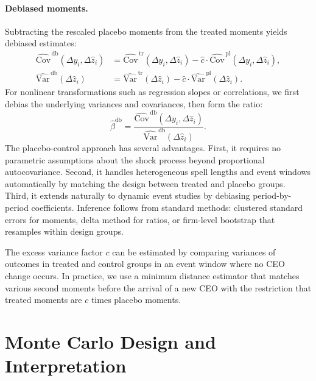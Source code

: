 \documentclass[11pt,a4paper]{article}
\newcommand{\Var}{\text{Var}}
\newcommand{\Cov}{\text{Cov}}
\begin{document}
\paragraph{Debiased moments.} Subtracting the rescaled placebo moments from the treated moments yields debiased estimates:
\begin{align}
\widehat{\Cov}^{\,\text{db}}(\Delta y_i,\Delta \hat z_i) &= \widehat{\Cov}^{\,\text{tr}}(\Delta y_i,\Delta \hat z_i) - \hat c\cdot\widehat{\Cov}^{\,\text{pl}}(\Delta y_i,\Delta \hat z_i),\\
\widehat{\Var}^{\,\text{db}}(\Delta \hat z_i) &= \widehat{\Var}^{\,\text{tr}}(\Delta \hat z_i) - \hat c\cdot\widehat{\Var}^{\,\text{pl}}(\Delta \hat z_i).
\end{align}
For nonlinear transformations such as regression slopes or correlations, we first debias the underlying variances and covariances, then form the ratio:
\begin{equation}
\hat\beta^{\text{db}} = \frac{\widehat{\Cov}^{\,\text{db}}(\Delta y_i,\Delta \hat z_i)}{\widehat{\Var}^{\,\text{db}}(\Delta \hat z_i)}.
\end{equation}
The placebo-control approach has several advantages. First, it requires no parametric assumptions about the shock process beyond proportional autocovariance. Second, it handles heterogeneous spell lengths and event windows automatically by matching the design between treated and placebo groups. Third, it extends naturally to dynamic event studies by debiasing period-by-period coefficients. Inference follows from standard methods: clustered standard errors for moments, delta method for ratios, or firm-level bootstrap that resamples within design groups.

The excess variance factor $c$ can be estimated by comparing variances of outcomes in treated and control groups in an event window where no CEO change occurs. In practice, we use a minimum distance estimator that matches various second moments before the arrival of a new CEO with the restriction that treated moments are $c$ times placebo moments. 

\section{Monte Carlo Design and Interpretation}
\end{document}
